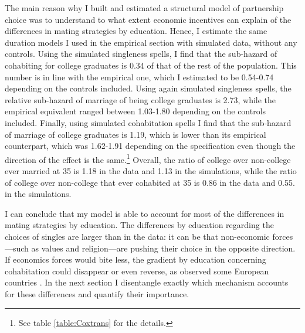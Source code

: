\documentclass[12pt]{article}
\begin{document}
The main reason why I built and estimated a structural model of partnership choice was to understand to what extent economic incentives can explain of the differences in mating strategies by education. Hence, I estimate the same duration models I used in the empirical section with simulated data, without any controls. Using the simulated singleness spells, I find that the sub-hazard of cohabiting for college graduates is 0.34 of that of the rest of the population. This number is in line with the empirical one, which I estimated to be 0.54-0.74 depending on the controls included. Using again simulated singleness spells, the relative sub-hazard of marriage of being college graduates is 2.73, while the empirical equivalent ranged between 1.03-1.80 depending on the controls included. Finally, using simulated cohabitation spells I find that the sub-hazard of marriage of college graduates is 1.19, which is lower than its empirical counterpart, which was 1.62-1.91 depending on the specification even though the direction of the effect is the same.\footnote{See table \ref{table:Coxtrans} for the details.} Overall, the ratio of college over non-college ever married at 35 is 1.18 in the data and 1.13 in the simulations, while the ratio of college over non-college that ever cohabited at 35 is 0.86 in the data and 0.55. in the simulations.

I can conclude that my model is able to account for most of the differences in mating strategies by education. The differences by education regarding the choices of singles are larger than in the data: it can be that non-economic forces---such as values and religion---are pushing their choice in the opposite direction. If economics forces would bite less, the gradient by education concerning cohabitation could disappear or even reverse, as observed some European countries \cite{perelli2016}. In the next section I disentangle exactly which mechanism accounts for these differences and quantify their importance.
\end{document}
